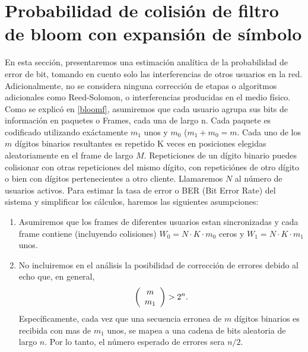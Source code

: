 \section{Probabilidad de colisión de filtro de bloom con expansión de símbolo}

En esta sección, presentaremos una estimación analítica de la probabilidad de error de bit, tomando en cuento solo las interferencias de otros usuarios en la red.
Adicionalmente, no se considera ninguna corrección de etapas o algoritmos adicionales como Reed-Solomon, o interferencias producidas en el medio físico.
Como se explicó en \ref{bloomf}, asumiremos que cada usuario agrupa sus bits de información en paquetes o Frames, cada una de largo n. Cada paquete es codificado utilizando exáctamente $m_{1}$ unos y $m_{0}$ ($m_{1}+m_{0}=m$. Cada uno de los $m$ dígitos binarios resultantes es repetido K veces en posiciones elegidas aleatoriamente en el frame de largo $M$. Repeticiones de un dígito binario puedes colisionar con otras repeticiones del mismo dígito, con repeticiónes de otro dígito o bien con dígitos pertenecientes a otro cliente.
Llamaremos $N$ al número de usuarios activos. Para estimar la tasa de error o BER (Bit Error Rate) del sistema y simplificar los cálculos, haremos las siguientes asumpciones:

\begin{enumerate}
 \item Asumiremos que los frames de diferentes usuarios estan sincronizadas y cada frame contiene (incluyendo colisiones) $W_0 = N\cdot K\cdot m_0$ ceros y $W_1 = N\cdot K\cdot m_1$ unos.
 \item No incluiremos en el análisis la posibilidad de corrección de errores debido al echo que, en general, 
 \begin{equation}
\left(\begin{array}{c} m \\ m_1\end{array}\right) > 2^n.
\end{equation}
Específicamente, cada vez que una secuencia erronea de $m$ dígitos binarios es recibida con mas de $m_1$ unos, se mapea a una cadena de bits aleatoria de largo $n$.
Por lo tanto, el número esperado de errores sera $n/2$.
\end{enumerate}

